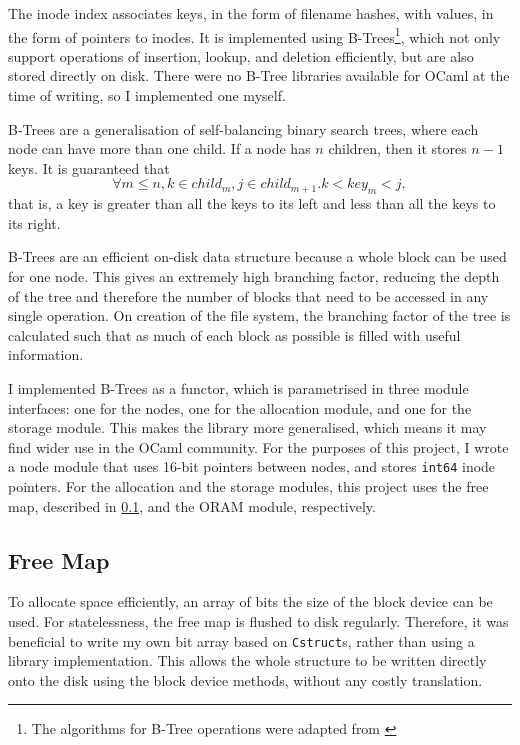 \documentclass[12pt,a4paper,twoside,openright]{report}
\begin{document}
The inode index associates keys, in the form of filename hashes, with values, in the form of pointers to inodes. It is implemented using B-Trees\footnote{The algorithms for B-Tree operations were adapted from \citet{CLRS09}}, which not only support operations of insertion, lookup, and deletion efficiently, but are also stored directly on disk. There were no B-Tree libraries available for OCaml at the time of writing, so I implemented one myself.

B-Trees are a generalisation of self-balancing binary search trees, where each node can have more than one child. If a node has $n$ children, then it stores $n-1$ keys. It is guaranteed that $$ \forall m \leq n, k \in child_m, j \in child_{m+1} . k < key_m < j,$$ that is, a key is greater than all the keys to its left and less than all the keys to its right.

B-Trees are an efficient on-disk data structure because a whole block can be used for one node. This gives an extremely high branching factor, reducing the depth of the tree and therefore the number of blocks that need to be accessed in any single operation. On creation of the file system, the branching factor of the tree is calculated such that as much of each block as possible is filled with useful information.

I implemented B-Trees as a functor, which is parametrised in three module interfaces: one for the nodes, one for the allocation module, and one for the storage module. This makes the library more generalised, which means it may find wider use in the OCaml community. For the purposes of this project, I wrote a node module that uses 16-bit pointers between nodes, and stores \texttt{int64} inode pointers. For the allocation and the storage modules, this project uses the free map, described in \cref{subsec:freemap}, and the ORAM module, respectively.

\subsection{Free Map}
\label{subsec:freemap}

To allocate space efficiently, an array of bits the size of the block device can be used. For statelessness, the free map is flushed to disk regularly. Therefore, it was beneficial to write my own bit array based on \texttt{Cstruct}s, rather than using a library implementation. This allows the whole structure to be written directly onto the disk using the block device methods, without any costly translation.
\end{document}
